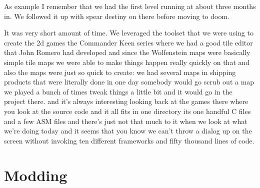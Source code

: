 \documentclass[book.tex]{subfiles}
\begin{document}
As example I remember that we had the first level running at about three months in. We followed it up with spear destiny on there before moving to doom.\\
\par
It was very short amount of time. We leveraged the toolset that we were using to create the 2d games the Commander Keen series where we had a good tile editor that John Romero had developed and since the Wolfenstein maps were basically simple tile maps we were able to make things happen really quickly on that and also the maps were just so quick to create: we had several maps in shipping products that were literally done in one day somebody would go scrub out a map we played a bunch of times tweak things a little bit and it would go in the project there. and it's  always interesting looking back  at  the games there where you look at the source code and it all fits in one directory its one handful C files and a few ASM files and there's just not that much to it when we look at what we're doing today and it seems that you know we can't throw a dialog up on the screen without invoking ten different frameworks and fifty thousand lines of code.\\



\section{Modding}
\end{document}
